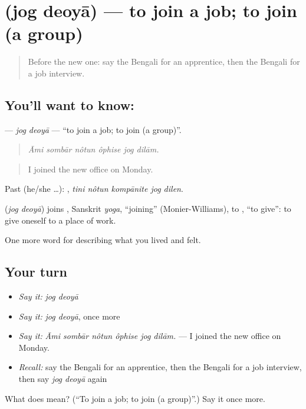 \section[\texorpdfstring{\bn{যোগ} \bn{দেওয়া} (jog deoyā)}{যোগ দেওয়া (jog deoyā)}]{  (jog deoyā) — to join a job; to join (a group)}

\label{lesson:BN-C494-jog-deoya}



\begin{quote}
Before the new one: say the Bengali for an apprentice, then the Bengali for a job interview.
\end{quote}

\subsection*{You'll want to know:  }
\textbf{ } — \emph{jog deoyā} — \textquotedblleft{}to join a job; to join (a group)\textquotedblright{}.

\begin{quote}
     
\end{quote}

\begin{quote}
\emph{Āmi sombār nôtun ôphise jog dilām.}
\end{quote}

\begin{quote}
I joined the new office on Monday.
\end{quote}

Past (he/she …):     , \emph{tini nôtun kompānite jog dilen}.

\begin{cousinweb}
\textbf{ } (\emph{jog deoyā}) joins , Sanskrit \emph{yoga}, \textquotedblleft{}joining\textquotedblright{} (Monier-Williams), to , \textquotedblleft{}to give\textquotedblright{}: to give oneself to a place of work.
\end{cousinweb}

\begin{grammarlens}[title={What you've built}]
One more word for describing what you lived and felt.
\end{grammarlens}

\subsection*{Your turn}
\begin{itemize}
\raggedright
  \item \emph{Say it:} \emph{jog deoyā}
  \item \emph{Say it:} \emph{jog deoyā}, once more
  \item \emph{Say it:} \emph{Āmi sombār nôtun ôphise jog dilām.} — I joined the new office on Monday.
  \item \emph{Recall:} say the Bengali for an apprentice, then the Bengali for a job interview, then say \emph{jog deoyā} again
\end{itemize}

\begin{tcolorbox}[breakable,colback=teal!4,colframe=teal!35!black,title={Before you move on}]
What does   mean? (\textquotedblleft{}To join a job; to join (a group)\textquotedblright{}.) Say it once more.
\end{tcolorbox}
